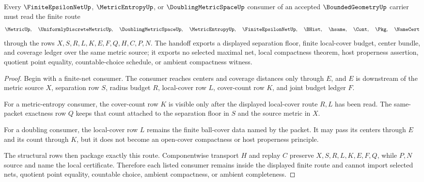 \begin{theorem}
\label{thm:bounded-geometry-finite-net-handoff}
Every $\FiniteEpsilonNetUp$, $\MetricEntropyUp$, or $\DoublingMetricSpaceUp$ consumer of an accepted $\BoundedGeometryUp$ carrier must read the finite route
$$
\MetricUp,\quad \UniformlyDiscreteMetricUp,\quad \DoublingMetricSpaceUp,\quad \MetricEntropyUp,\quad \FiniteEpsilonNetUp,\quad \BHist,\quad \hsame,\quad \Cont,\quad \Pkg,\quad \NameCert
$$
through the rows $X,S,R,L,K,E,F,Q,H,C,P,N$. The handoff exports a displayed separation floor, finite local-cover budget, center bundle, and coverage ledger over the same metric source; it exports no selected maximal net, local compactness theorem, host properness assertion, quotient point equality, countable-choice schedule, or ambient compactness witness.
\end{theorem}
\begin{proof}
Begin with a finite-net consumer. The consumer reaches centers and coverage distances only through $E$, and $E$ is downstream of the metric source $X$, separation row $S$, radius budget $R$, local-cover row $L$, cover-count row $K$, and joint budget ledger $F$.

For a metric-entropy consumer, the cover-count row $K$ is visible only after the displayed local-cover route $R,L$ has been read. The same-packet exactness row $Q$ keeps that count attached to the separation floor in $S$ and the source metric in $X$.

For a doubling consumer, the local-cover row $L$ remains the finite ball-cover data named by the packet. It may pass its centers through $E$ and its count through $K$, but it does not become an open-cover compactness or host properness principle.

The structural rows then package exactly this route. Componentwise transport $H$ and replay $C$ preserve $X,S,R,L,K,E,F,Q$, while $P,N$ source and name the local certificate. Therefore each listed consumer remains inside the displayed finite route and cannot import selected nets, quotient point equality, countable choice, ambient compactness, or ambient completeness.
\end{proof}


